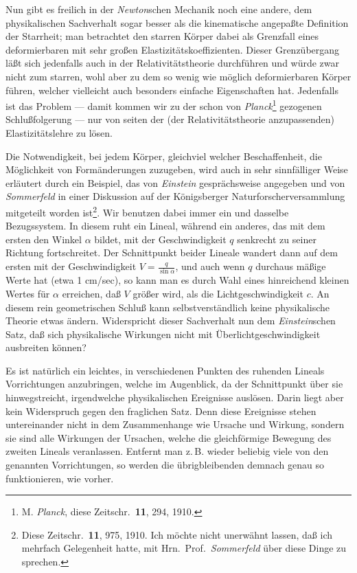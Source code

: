 \documentclass[12pt,a4paper]{article}
\newcommand{\opage}[1]{\marginnote{\footnotesize\textit{[#1]}}}
\begin{document}
Nun gibt es freilich in der \emph{Newton}schen Mechanik noch eine andere, dem physikalischen Sachverhalt sogar besser als die kinematische angepaßte Definition der Starrheit; man betrachtet den starren Körper dabei als Grenzfall eines deformierbaren mit sehr großen Elastizitätskoeffizienten.
Dieser Grenzübergang läßt sich jedenfalls auch in der Relativitätstheorie durchführen und würde zwar nicht zum starren, wohl aber zu dem so wenig wie möglich deformierbaren Körper führen, welcher vielleicht auch besonders einfache Eigenschaften hat.
Jedenfalls ist das Problem --- damit kommen wir zu der schon von \emph{Planck}\footnote[1]{M. \emph{Planck}, diese Zeitschr.\ \textbf{11}, 294, 1910.} gezogenen Schlußfolgerung --- nur von seiten der (der Relativitätstheorie anzupassenden) Elastizitätslehre zu lösen.

Die Notwendigkeit, bei jedem Körper, gleichviel welcher Beschaffenheit, die Möglichkeit von Formänderungen zuzugeben, wird auch in sehr sinnfälliger Weise erläutert durch ein Beispiel, das von \emph{Einstein} gesprächsweise angegeben und von \emph{Sommerfeld} in einer Diskussion auf der Königsberger Naturforscherversammlung mitgeteilt worden ist\footnote[2]{Diese Zeitschr.\ \textbf{11}, 975, 1910.
Ich möchte nicht unerwähnt lassen, daß ich mehrfach Gelegenheit hatte, mit Hrn.\ Prof.\ \emph{Sommerfeld} über diese Dinge zu sprechen.}.
Wir benutzen dabei immer ein und dasselbe Bezugssystem.
In diesem ruht ein Lineal, während ein anderes, das mit dem ersten den Winkel $\alpha$ bildet, mit der Geschwindigkeit $q$ senkrecht zu seiner Richtung fortschreitet.
Der Schnittpunkt beider Lineale wandert dann auf dem ersten mit der Geschwindigkeit $V = \frac{q}{\sin\alpha}$, und auch wenn $q$ durchaus mäßige Werte hat (etwa 1 cm/sec), so kann man es durch Wahl eines hinreichend kleinen Wertes für $\alpha$ erreichen, daß $V$ größer wird, als die Lichtgeschwindigkeit $c$.
An diesem rein geometrischen Schluß kann selbstverständlich keine physikalische Theorie etwas ändern.
Widerspricht dieser Sachverhalt nun dem \emph{Einstein}schen Satz, daß sich physikalische Wirkungen nicht mit Überlichtgeschwindigkeit ausbreiten können?

\opage{87}
Es ist natürlich ein leichtes, in verschiedenen Punkten des ruhenden Lineals Vorrichtungen anzubringen, welche im Augenblick, da der Schnittpunkt über sie hinwegstreicht, irgendwelche physikalischen Ereignisse auslösen.
Darin liegt aber kein Widerspruch gegen den fraglichen Satz.
Denn diese Ereignisse stehen untereinander nicht in dem Zusammenhange wie Ursache und Wirkung, sondern sie sind alle Wirkungen der Ursachen, welche die gleichförmige Bewegung des zweiten Lineals veranlassen.
Entfernt man z.\,B. wieder beliebig viele von den genannten Vorrichtungen, so werden die übrigbleibenden demnach genau so funktionieren, wie vorher.
\end{document}
